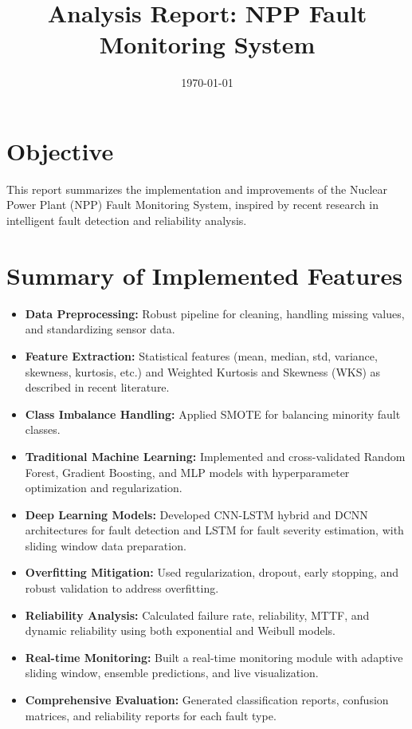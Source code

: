 \documentclass[12pt]{article}
\title{Analysis Report: NPP Fault Monitoring System}
\author{}
\date{\today}
\begin{document}
\maketitle

\section*{Objective}
This report summarizes the implementation and improvements of the Nuclear Power Plant (NPP) Fault Monitoring System, inspired by recent research in intelligent fault detection and reliability analysis.

\section*{Summary of Implemented Features}
\begin{itemize}
    \item \textbf{Data Preprocessing:} Robust pipeline for cleaning, handling missing values, and standardizing sensor data.
    \item \textbf{Feature Extraction:} Statistical features (mean, median, std, variance, skewness, kurtosis, etc.) and Weighted Kurtosis and Skewness (WKS) as described in recent literature.
    \item \textbf{Class Imbalance Handling:} Applied SMOTE for balancing minority fault classes.
    \item \textbf{Traditional Machine Learning:} Implemented and cross-validated Random Forest, Gradient Boosting, and MLP models with hyperparameter optimization and regularization.
    \item \textbf{Deep Learning Models:} Developed CNN-LSTM hybrid and DCNN architectures for fault detection and LSTM for fault severity estimation, with sliding window data preparation.
    \item \textbf{Overfitting Mitigation:} Used regularization, dropout, early stopping, and robust validation to address overfitting.
    \item \textbf{Reliability Analysis:} Calculated failure rate, reliability, MTTF, and dynamic reliability using both exponential and Weibull models.
    \item \textbf{Real-time Monitoring:} Built a real-time monitoring module with adaptive sliding window, ensemble predictions, and live visualization.
    \item \textbf{Comprehensive Evaluation:} Generated classification reports, confusion matrices, and reliability reports for each fault type.
\end{itemize}
\end{document}
